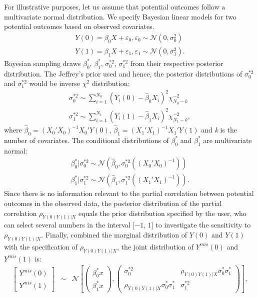 	For illustrative purposes, let us assume that potential outcomes follow a multivariate normal distribution. We specify Bayesian linear models for two potential outcomes based on observed covariates. 
	\begin{align}
		Y(0) = \beta_{0}X + \varepsilon_{0}, \varepsilon_{0} \sim \mathcal{N}(0, \sigma_{0}^2)\\
		Y(1) = \beta_{1}X + \varepsilon_{1}, \varepsilon_{1} \sim \mathcal{N}(0, \sigma_{1}^2).
	\end{align}
	Bayesian sampling draws $\beta_{0}^{*}$, $\beta_{1}^{*}$, $\sigma_{0}^{*2}$, $\sigma_{1}^{*2}$ from their respective posterior distribution. The Jeffrey's prior used and hence, the posterior distributions of $\sigma_{0}^{*2}$ and $\sigma_{1}^{*2}$ would be inverse $\chi^2$ distribution:
	\begin{align}
		\sigma_{0}^{*2} \sim \sum_{i = 1}^{N_{0}}(Y_i(0) - \hat{\beta}_{0}X_{i})^2\chi_{N_{0} - k}^{-2}\\
		\sigma_{1}^{*2} \sim \sum_{i = 1}^{N_{1}}(Y_i(1) - \hat{\beta}_{1}X_{i})^2\chi_{N_{1} - k}^{-2},
	\end{align}
	where $\hat{\beta}_{0} = (X_{0}'X_{0})^{-1}X_{0}'Y(0)$, $\hat{\beta}_{1} = (X_{1}'X_{1})^{-1}X_{1}'Y(1)$ and \emph{k} is the number of covariates. The conditional distributions of  $\beta_{0}^{*}$ and $\beta_{1}^{*}$ are multivariate normal:
	\begin{align}
		\beta_{0}^{*} | \sigma_{0}^{*2} \sim \mathcal{N}(\hat{\beta}_{0}, \sigma_{0}^{*2}((X_{0}'X_{0})^{-1}))\\
		\beta_{1}^{*} | \sigma_{1}^{*2} \sim \mathcal{N}(\hat{\beta}_{1}, \sigma_{1}^{*2}((X_{1}'X_{1})^{-1})).
	\end{align}
	Since there is no information relevant to the partial correlation between potential outcomes in the observed data, the posterior distribution of the partial correlation $\rho_{Y(0)Y(1)|X}$ equals the prior distribution specified by the user, who can select several numbers in the interval [$-1$, $1$] to investigate the sensitivity to $\rho_{Y(0)Y(1)|X}$. 
	Finally, combined the marginal distribution of $Y(0)$ and $Y(1)$ with the specification of $\rho_{Y(0)Y(1)|X}$, the joint distribution of $Y^{mis}(0)$ and $Y^{mis}(1)$ is:
	\begin{eqnarray}
		\left[\begin{array}{c}
			Y^{mis}(0)\\
			Y^{mis}(1)
		\end{array}\right] & \sim & \mathcal{N}\left[\left(\begin{array}{c}
			\beta^{*}_{0}x\\
			\beta^{*}_{1}x
		\end{array}\right),\left(\begin{array}{cc}
			\sigma^{*2}_{0} & \rho_{Y(0)Y(1)|X}\sigma^{*}_{0}\sigma^{*}_{1}\\
			\rho_{Y(0)Y(1)|X}\sigma^{*}_{0}\sigma^{*}_{1} & \sigma^{*2}_{1}
		\end{array}\right)\right],
	\end{eqnarray}
